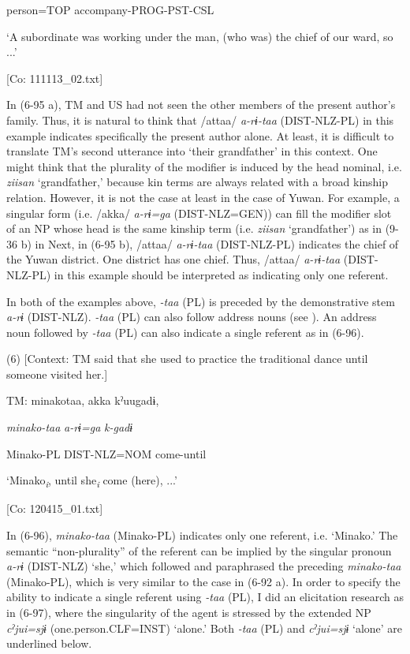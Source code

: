      person=TOP  accompany-PROG-PST-CSL

      ‘A subordinate was working under the man, (who was) the chief of our ward, so ...’

      [Co: 111113\_02.txt]

In (6-95 a), TM and US had not seen the other members of the present author’s family. Thus, it is natural to think that /attaa/ \textit{a-rɨ-taa} (DIST-NLZ-PL) in this example indicates specifically the present author alone. At least, it is difficult to translate TM’s second utterance into ‘their grandfather’ in this context. One might think that the plurality of the modifier is induced by the head nominal, i.e. \textit{ziisan} ‘grandfather,’ because kin terms are always related with a broad kinship relation. However, it is not the case at least in the case of Yuwan. For example, a singular form (i.e. /akka/ \textit{a-rɨ=ga} (DIST-NLZ=GEN)) can fill the modifier slot of an NP whose head is the same kinship term (i.e. \textit{ziisan} ‘grandfather’) as in (9-36 b) in  Next, in (6-95 b), /attaa/ \textit{a-rɨ-taa} (DIST-NLZ-PL) indicates the chief of the Yuwan district. One district has one chief. Thus, /attaa/ \textit{a-rɨ-taa} (DIST-NLZ-PL) in this example should be interpreted as indicating only one referent.

In both of the examples above, \textit{{}-taa} (PL) is preceded by the demonstrative stem \textit{a-rɨ} (DIST-NLZ). \textit{{}-taa} (PL) can also follow address nouns (see ). An address noun followed by \textit{{}-taa} (PL) can also indicate a single referent as in (6-96).

(6)  [Context: TM said that she used to practice the traditional dance until someone visited her.]

  TM:  minakotaa,  akka  kˀuugadɨ,

    \textit{minako-taa}  \textit{a-rɨ=ga}  \textit{k-gadɨ}

    Minako-PL  DIST-NLZ=NOM  come-until

    ‘Minako\textit{\textsubscript{i}}, until she\textit{\textsubscript{i}} come (here), ...’

    [Co: 120415\_01.txt]

In (6-96), \textit{minako-taa} (Minako-PL) indicates only one referent, i.e. ‘Minako.’ The semantic “non-plurality” of the referent can be implied by the singular pronoun \textit{a-rɨ} (DIST-NLZ) ‘she,’ which followed and paraphrased the preceding \textit{minako-taa} (Minako-PL), which is very similar to the case in (6-92 a). In order to specify the ability to indicate a single referent using \textit{{}-taa} (PL), I did an elicitation research as in (6-97), where the singularity of the agent is stressed by the extended NP \textit{cˀjui=sjɨ} (one.person.CLF=INST) ‘alone.’ Both \textit{{}-taa} (PL) and \textit{cˀjui=sjɨ} ‘alone’ are underlined below.


